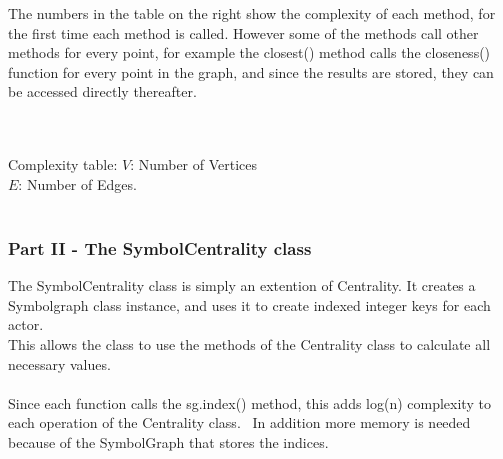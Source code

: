 \documentclass[11pt]{article}
\begin{document}
\begin{minipage}[b]{0.5\linewidth}
The numbers in the table on the right show the complexity of each method, for the first time each method is called. 
However some of the methods call other methods for every point, for example the closest() method calls the closeness() function for every point in the graph,
and since the results are stored, they can be accessed directly thereafter. \\ \\ 
\end{minipage}
\begin{minipage}[b]{0.5\linewidth}\centering
{}
\small{Complexity table: $V$: Number of Vertices \\$E$: Number of Edges.} \\ \\ 
\end{minipage}

\subsubsection*{Part II - The SymbolCentrality class}
The SymbolCentrality class is simply an extention of Centrality. It creates a Symbolgraph class instance, and uses it to create indexed integer keys for each actor.\\
This allows the class to use the methods of the Centrality class to calculate all necessary values. \\ \\
Since each function calls the sg.index() method, this adds log(n) complexity to each operation of the Centrality class. 
In addition more memory is needed because of the SymbolGraph that stores the indices.
\end{document}
